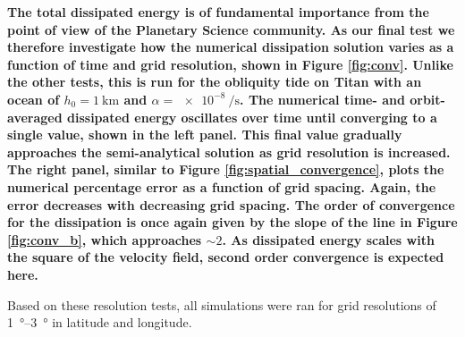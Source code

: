 \textbf{The total dissipated energy is of fundamental importance from the point of view of the Planetary Science community. As our final test we therefore investigate how the numerical dissipation solution varies as a function of time and grid resolution, shown in Figure \ref{fig:conv}. Unlike the other tests, this is run for the obliquity tide on Titan with an ocean of $h_0 = \SI{1}{\kilo\metre}$ and $\alpha = \SI{e-8}{\per\second}$. The numerical time- and orbit-averaged dissipated energy oscillates over time until converging to a single value, shown in the left panel. This final value gradually approaches the \citet{matsuyama2014tidal} semi-analytical solution as grid resolution is increased. The right panel, similar to Figure \ref{fig:spatial_convergence}, plots the numerical percentage error as a function of grid spacing. Again, the error decreases with decreasing grid spacing. The order of convergence for the dissipation is once again given by the slope of the line in Figure \ref{fig:conv_b}, which approaches $\sim 2$. As dissipated energy scales with the square of the velocity field, second order convergence is expected here.} 

Based on these resolution tests, all simulations were ran for grid resolutions of \SIrange{1}{3}{\degree} in latitude and longitude.